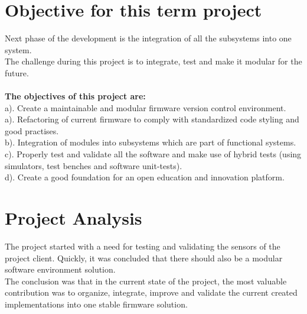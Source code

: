 \section{Objective for this term project}
Next phase of the development is the integration of all the subsystems into one system.\\ 
The challenge during this project is to integrate, test and make it modular for the future. \\ \\ 
\textbf{The objectives of this project are:}\\
a). Create a maintainable and modular firmware version control environment. \\ 
a). Refactoring of current firmware to comply with standardized code styling and good practises.\\
b). Integration of modules into subsystems which are part of functional systems.\\
c). Properly test and validate all the software and make use of hybrid tests (using simulators, test benches and software unit-tests).\\
d). Create a good foundation for an open education and innovation platform.\\

\section {Project Analysis}
The project started with a need for testing and validating the sensors of the project client. Quickly, it was concluded that there should also be a modular software environment solution.\\ The conclusion was that in the current state of the project, the most valuable contribution was to organize, integrate, improve and validate the current created implementations into one stable firmware solution. 